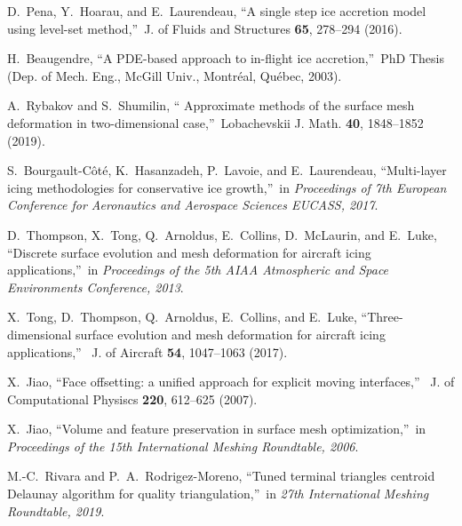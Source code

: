 \documentclass[
11pt,%
tightenlines,%
twoside,%
onecolumn,%
nofloats,%
nobibnotes,%
nofootinbib,%
superscriptaddress,%
noshowpacs,%
centertags]%
{revtex4-2}
\begin{document}
\begin{thebibliography}{99}
D.~Pena, Y.~Hoarau, and E.~Laurendeau, \textquotedblleft A  single
step ice accretion model using level-set method,\textquotedblright \
J. of Fluids and Structures {\bf 65}, 278--294 (2016).



 H.~Beaugendre, \textquotedblleft A PDE-based approach
to in-flight ice accretion,\textquotedblright \ PhD Thesis (Dep. of
Mech. Eng., McGill Univ., Montr\'eal, Qu\'ebec, 2003).

 A.~Rybakov and S.~Shumilin, \textquotedblleft
Approximate  methods of the surface mesh deformation in
two-dimensional case,\textquotedblright \ Lobachevskii J. Math. {\bf
40}, 1848--1852 (2019).

 S.~Bourgault-C\^ot\'e, K.~Hasanzadeh, P.~Lavoie,
and E.~Laurendeau, \textquotedblleft Multi-layer  icing
methodologies for conservative ice growth,\textquotedblright \ in
\textit{Proceedings of 7th European Conference for Aeronautics and
Aerospace Sciences EUCASS, 2017}.

 D.~Thompson, X.~Tong, Q.~Arnoldus, E.~Collins,
D.~McLaurin, and E.~Luke, \textquotedblleft Discrete  surface
evolution and mesh deformation for aircraft icing
applications,\textquotedblright \ in \textit{Proceedings of the 5th
AIAA Atmospheric and Space Environments Conference, 2013}.

 X.~Tong, D.~Thompson, Q.~Arnoldus, E.~Collins, and
E.~Luke, \textquotedblleft Three-dimensional  surface evolution and
mesh deformation for aircraft icing applications,\textquotedblright
\ J. of Aircraft {\bf 54}, 1047--1063 (2017).

 X.~Jiao, \textquotedblleft Face offsetting: a
unified approach  for explicit moving interfaces,\textquotedblright
\ J. of Computational Physiscs {\bf 220}, 612--625 (2007).

 X.~Jiao, \textquotedblleft Volume and feature
preservation in  surface mesh optimization,\textquotedblright \ in
\textit{Proceedings of the 15th International Meshing Roundtable,
2006}.


 M.-C.~Rivara and P.~A.~Rodrigez-Moreno,
\textquotedblleft Tuned terminal  triangles centroid Delaunay
algorithm for quality triangulation,\textquotedblright \ in
\textit{27th International Meshing Roundtable, 2019}.


\end{thebibliography}
\end{document}

